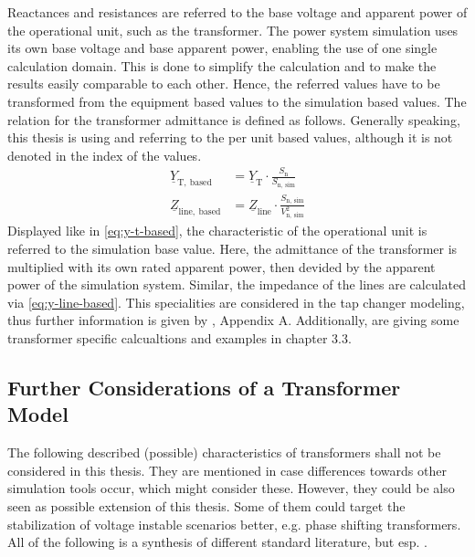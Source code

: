 Reactances and resistances are referred to the base voltage and apparent power of the operational unit, such as the transformer. 
The power system simulation uses its own base voltage and base apparent power, enabling the use of one single calculation domain. 
This is done to simplify the calculation and to make the results easily comparable to each other. 
Hence, the referred values have to be transformed from the equipment based values to the simulation based values. 
The relation for the transformer admittance is defined as follows. 
Generally speaking, this thesis is using and referring to the per unit based values, although it is not denoted in the index of the values.
\begin{align}
    \underline{Y}_\mathrm{T,~based}&=\underline{Y}_\mathrm{T} \cdot \frac{S_\mathrm{n}}{S_\mathrm{n,~sim}} \label{eq:y-t-based} \\[6pt]
    \underline{Z}_\mathrm{line,~based}&=\underline{Z}_\mathrm{line} \cdot \frac{S_\mathrm{n,~sim}}{V_\mathrm{n,~sim}^2} \label{eq:y-line-based}
\end{align}
Displayed like in \autoref{eq:y-t-based}, the characteristic of the operational unit is referred to the simulation base value. 
Here, the admittance of the transformer is multiplied with its own rated apparent power, then devided by the apparent power of the simulation system. 
Similar, the impedance of the lines are calculated via \autoref{eq:y-line-based}. 
This specialities are considered in the tap changer modeling, thus further information is given by \textcite{machowski_2020}, Appendix A.
Additionally, \textcite{glover_2017a} are giving some transformer specific calcualtions and examples in chapter 3.3.

\subsection{Further Considerations of a Transformer Model}
\label{sec:further-considerations}

The following described (possible) characteristics of transformers shall not be considered in this thesis.
They are mentioned in case differences towards other simulation tools occur, which might consider these.
However, they could be also seen as possible extension of this thesis.
Some of them could target the stabilization of voltage instable scenarios better, e.g. phase shifting transformers. 
All of the following is a synthesis of different standard literature, but esp. \autocite{schwab_2022,oeding_2016,machowski_2020,kundur_2022}.

